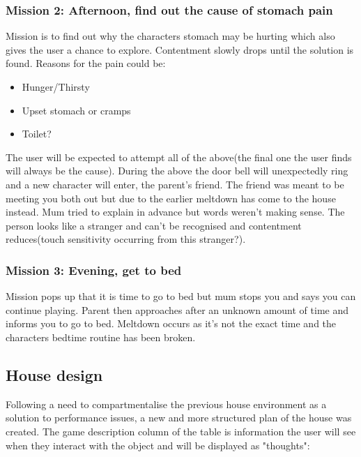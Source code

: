 \documentclass[11pt]{report}
\begin{document}
\subsubsection*{Mission 2: Afternoon, find out the cause of stomach pain}
Mission is to find out why the characters stomach may be hurting which also gives the user a chance to explore. Contentment slowly drops until the solution is found. Reasons for the pain could be:

\begin{itemize}
\item Hunger/Thirsty
\item Upset stomach or cramps
\item Toilet?
\end{itemize}

The user will be expected to attempt all of the above(the final one the user finds will always be the cause). During the above the door bell will unexpectedly ring and a new character will enter, the parent's friend. The friend was meant to be meeting you both out but due to the earlier meltdown has come to the house instead. Mum tried to explain in advance but words weren't making sense. The person looks like a stranger and can't be recognised and contentment reduces(touch sensitivity occurring from this stranger?). 

\subsubsection*{Mission 3: Evening, get to bed}
Mission pops up that it is time to go to bed but mum stops you and says you can continue playing. Parent then approaches after an unknown amount of time and informs you to go to bed. Meltdown occurs as it's not the exact time and the characters bedtime routine has been broken.

\subsection{House design}
Following a need to compartmentalise the previous house environment as a solution to performance issues, a new and more structured plan of the house was created. The game description column of the table is information the user will see when they interact with the object and will be displayed as "thoughts":
\end{document}
